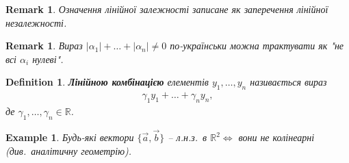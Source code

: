 \documentclass[a4paper, 10pt]{article}
\theoremstyle{theoremdd}
\newtheorem{definition}[theorem]{Definition}
\newtheorem{example}[theorem]{Example}
\newtheorem{remark}[theorem]{Remark}
\begin{document}
	\begin{remark}
	Означення лінійної залежності записане як заперечення лінійної незалежності.
	\end{remark}
	
	\begin{remark}
	Вираз $|\alpha_1| + \dots + |\alpha_n| \ne 0$ по-українськи можна трактувати як "не всі $\alpha_i$ нулеві".
	\end{remark}
	
	\begin{definition}
	\textbf{Лінійною комбінацією} елементів $y_1,\dots,y_n$ називається вираз
	\begin{align*}
	\gamma_1 y_1 + \dots + \gamma_n y_n,
	\end{align*}
	де $\gamma_1, \dots, \gamma_n \in \mathbb{R}$.
	\end{definition}
	
	\begin{example}
	Будь-які вектори $\{\vec{a}, \vec{b} \}$ -- л.н.з.\ в $\mathbb{R}^2 \iff $ вони не колінеарні (див.\ аналітичну геометрію).
	\end{example}
	
\end{document}
